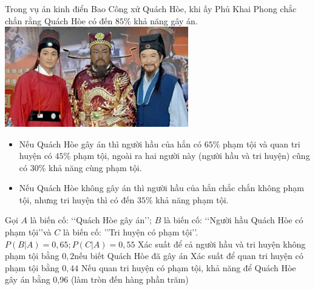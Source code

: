 \begin{ex}%
\immini
{
    Trong vụ án kinh điển Bao Công xử Quách Hòe, khi ấy Phủ Khai Phong chắc chắn rằng Quách Hòe có đến $85\% $ khả năng gây án.
}
{
\includegraphics[width=8cm]{img/HXN-10-16}
}
\begin{itemize}
    \item Nếu Quách Hòe gây án thì người hầu của hắn có $65\%$ phạm tội và quan tri huyện có $45\%$ phạm tội, ngoài ra hai người này (người hầu và tri huyện) cũng có $30\%$ khả năng cùng phạm tội.
    \item Nếu Quách Hòe không gây án thì người hầu của hắn chắc chắn không phạm tội, nhưng tri huyện thì có đến $35\%$ khả năng phạm tội.
\end{itemize}
    Gọi $A$ là biến cố: \lq\lq Quách Hòe gây án\rq\rq; $B$ là biến cố: \lq\lq Người hầu Quách Hòe có phạm tội\rq\rq và $C$ là biến cố: \rq\rq Tri huyện có phạm tội\rq\rq.
    \choiceTF
    {$ P(B|A)=0,65;P\left(C|A\right)=0{,}55$}
    {\True Xác suất để cả người hầu và tri huyện không phạm tội bằng $0{,}2 $nếu biết Quách Hòe đã gây án}
    {Xác suất để quan tri huyện có phạm tội bằng $0{,}44$}
    {\True Nếu quan tri huyện có phạm tội, khả năng để Quách Hòe gây án bằng 0,96 (làm tròn đến hàng phần trăm)}
\end{ex}

